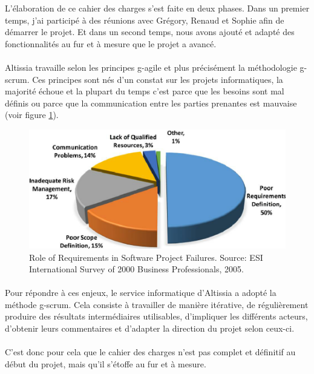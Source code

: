 L'élaboration de ce cahier des charges s'est faite en deux phases. 
Dans un premier temps, j'ai participé à des réunions avec Grégory, Renaud et Sophie afin de démarrer le projet. 
Et dans un second temps, nous avons ajouté et adapté des fonctionnalités au fur et à mesure que le projet a avancé.

\paragraph{}
Altissia travaille selon les principes \Gls{g-agile} et plus précisément la méthodologie \Gls{g-scrum}.
Ces principes sont nés d'un constat sur les projets informatiques, la majorité échoue\cite{standish_standish_nodate} et la plupart du temps c'est parce que les besoins sont mal définis ou parce que la communication entre les parties prenantes est mauvaise (voir figure \ref{fig:why-projects-fails}).

\begin{figure}[ht]
    \centering
    \includegraphics[scale=.8]{images/why-projects-fail.png}
    \caption{Role of Requirements in Software Project Failures. Source: ESI International Survey of 2000 Business Professionals, 2005.}
    \label{fig:why-projects-fails}
\end{figure}

\paragraph{}
Pour répondre à ces enjeux, le service informatique d'Altissia a adopté la méthode \Gls{g-scrum}.
Cela consiste à travailler de manière itérative, de régulièrement produire des résultats intermédiaires utilisables, d'impliquer les différents acteurs, d'obtenir leurs commentaires et d'adapter la direction du projet selon ceux-ci.

\paragraph{}
C'est donc pour cela que le cahier des charges n'est pas complet et définitif au début du projet, mais qu'il s'étoffe au fur et à mesure.
